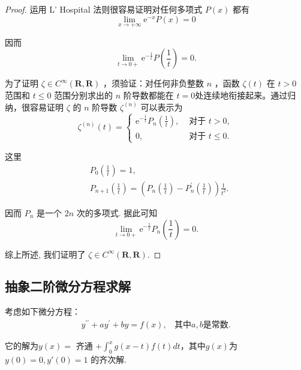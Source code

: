 \begin{proof}
    运用 L' Hospital 法则很容易证明对任何多项式 $P(x)$ 都有
    $$
        \lim _{x \rightarrow+\infty} \mathrm{e}^{-x} P(x)=0
    $$

    因而
    $$
        \lim _{t \rightarrow 0+} \mathrm{e}^{-\frac{1}{t}} P\left(\frac{1}{t}\right)=0 .
    $$

    为了证明 $\zeta \in C^{\infty}(\boldsymbol{R}, \boldsymbol{R})$ ，须验证：对任何非负整数 $n$ ，函数 $\zeta(t)$ 在 $t>0$ 范围和 $t \leqslant 0$ 范围分别求出的 $n$ 阶导数都能在 $t=0$处连续地衔接起来。通过归纳，很容易证明 $\zeta$ 的 $n$ 阶导数 $\zeta^{(n)}$ 可以表示为
    $$
        \zeta^{(n)}(t)= \begin{cases}\mathrm{e}^{-\frac{1}{t}} P_n\left(\frac{1}{t}\right), & \text { 对于 } t>0, \\ 0, & \text { 对于 } t \leqslant 0 .\end{cases}
    $$

    这里
    $$
        \begin{aligned}
             & P_0\left(\frac{1}{t}\right)=1,                                                                                                \\
             & P_{n+1}\left(\frac{1}{t}\right)=\left(P_n\left(\frac{1}{t}\right)-P_n^{\prime}\left(\frac{1}{t}\right)\right) \frac{1}{t^2} .
        \end{aligned}
    $$

    因而 $P_n$ 是一个 $2 n$ 次的多项式. 据此可知
    $$
        \lim _{t \rightarrow 0+} \mathrm{e}^{-\frac{1}{t}} P_n\left(\frac{1}{t}\right)=0 .
    $$

    综上所述, 我们证明了 $\zeta \in C^{\infty}(\boldsymbol{R}, \boldsymbol{R})$.
\end{proof}

\subsection{抽象二阶微分方程求解}



\begin{theorem}\label{memeda15}
    考虑如下微分方程：
    \begin{align}
        y^{\prime \prime}+a y^{\prime}+b y=f(x),\ \ \ \ \text{其中}a,b\text{是常数.}
    \end{align}

    它的解为$y(x)=$ 齐通 $\displaystyle +\int_0^x g(x-t) f(t) d t$，其中$g(x)$为$y(0)=0, y'(0)=1$ 的齐次解.
\end{theorem}

